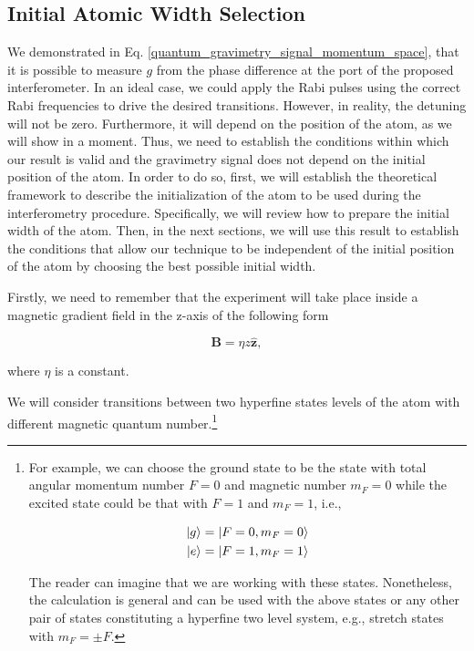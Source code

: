 \documentclass{article}
\begin{document}
\subsection{Initial Atomic Width Selection}
We demonstrated in Eq. \ref{quantum_gravimetry_signal_momentum_space}, that it is possible to measure $g$ from the phase difference at the port of the proposed interferometer. In an ideal case, we could apply the Rabi pulses using the correct Rabi frequencies to drive the desired transitions. However, in reality, the detuning will not be zero. Furthermore, it will depend on the position of the atom, as we will show in a moment. Thus, we need to establish the conditions within which our result is valid and the gravimetry signal does not depend on the initial position of the atom.
In order to do so, first, we will establish the theoretical framework to describe the initialization of the atom to be used during the interferometry procedure. Specifically, we will review how to prepare the initial width of the atom. Then, in the next sections, we will use this result to establish the conditions that allow our technique to be independent of the initial position of the atom  by choosing the best possible initial width.

Firstly, we need to remember that the experiment will take place inside a magnetic gradient field in the z-axis of the following form

\begin{equation*}
\textbf{B} = \eta z \hat{\textbf{z}},
\end{equation*}

where $\eta$ is a constant.

We will consider transitions between two hyperfine states levels of the atom with different magnetic quantum number.\footnote{For example, we can choose the ground state to be the state with total angular momentum number $F=0$ and magnetic number $m_{F}=0$ while the excited state could be that with $F=1$ and $m_{F}=1$, i.e.,

\begin{equation}
\begin{aligned}
\ket{g} = \ket{F=0, m_{F}=0} \\
\ket{e} = \ket{F=1, m_{F}=1}
\end{aligned}
\end{equation}

The reader can imagine that we are working with these states. Nonetheless, the calculation is general and can be used with the above states or any other pair of states constituting a hyperfine two level system, e.g., stretch states with $m_{F}=\pm F$.}
\end{document}
